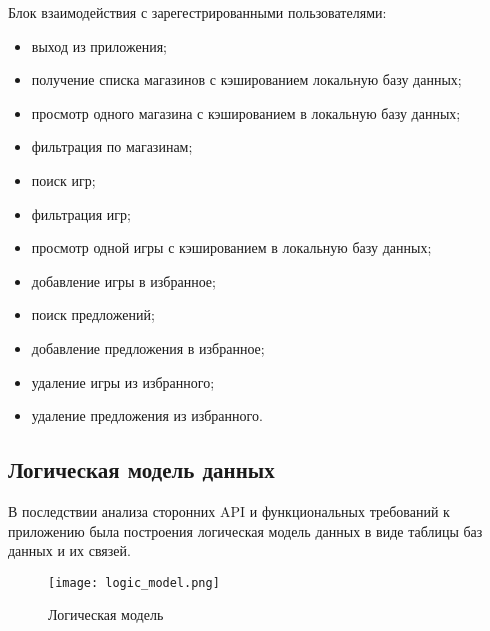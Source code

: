 Блок взаимодействия с зарегестрированными пользователями:

\begin{itemize}
    \item выход из приложения;
    \item получение списка магазинов с кэшированием локальную базу данных;
    \item просмотр одного магазина с кэшированием в локальную базу данных;
    \item фильтрация по магазинам;
    \item поиск игр;
    \item фильтрация игр;
    \item просмотр одной игры с кэшированием в локальную базу данных;
    \item добавление игры в избранное;
    \item поиск предложений;
    \item добавление предложения в избранное;
    \item удаление игры из избранного;
    \item удаление предложения из избранного.
\end{itemize}


\subsection{Логическая модель данных}

В последствии анализа сторонних API и функциональных требований к приложению была построения логическая модель данных в виде таблицы баз данных и их связей.

\begin{figure}[H]
 \centering
   \texttt{[image: logic\_model.png]} 
   \caption{Логическая модель}
   \label{fig:domain:logic_model}
\end{figure}

